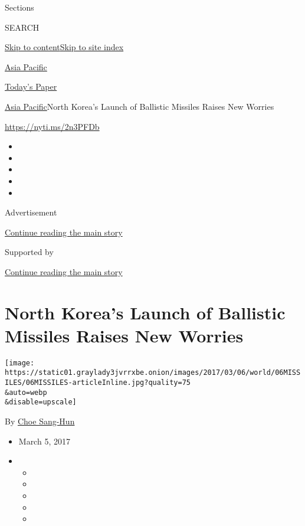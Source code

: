 Sections

SEARCH

\protect\hyperlink{site-content}{Skip to
content}\protect\hyperlink{site-index}{Skip to site index}

\href{https://www.nytimes3xbfgragh.onion/section/world/asia}{Asia
Pacific}

\href{https://myaccount.nytimes3xbfgragh.onion/auth/login?response_type=cookie\&client_id=vi}{}

\href{https://www.nytimes3xbfgragh.onion/section/todayspaper}{Today's
Paper}

\href{/section/world/asia}{Asia Pacific}\textbar{}North Korea's Launch
of Ballistic Missiles Raises New Worries

\url{https://nyti.ms/2n3PFDb}

\begin{itemize}
\item
\item
\item
\item
\item
\end{itemize}

Advertisement

\protect\hyperlink{after-top}{Continue reading the main story}

Supported by

\protect\hyperlink{after-sponsor}{Continue reading the main story}

\hypertarget{north-koreas-launch-of-ballistic-missiles-raises-new-worries}{%
\section{North Korea's Launch of Ballistic Missiles Raises New
Worries}\label{north-koreas-launch-of-ballistic-missiles-raises-new-worries}}

\texttt{[image: https://static01.graylady3jvrrxbe.onion/images/2017/03/06/world/06MISSILES/06MISSILES-articleInline.jpg?quality=75\\\&auto=webp\\\&disable=upscale]}

By \href{http://www.nytimes3xbfgragh.onion/by/choe-sang-hun}{Choe
Sang-Hun}

\begin{itemize}
\item
  March 5, 2017
\item
  \begin{itemize}
  \item
  \item
  \item
  \item
  \item
  \end{itemize}
\end{itemize}

